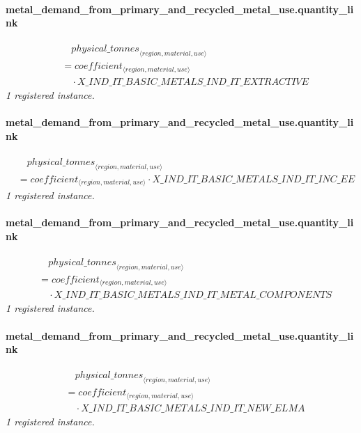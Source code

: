 \documentclass[11pt]{article}
\begin{document}
\paragraph{metal\_demand\_from\_primary\_and\_recycled\_metal\_use.quantity\_link}
\begin{align*}
&\quad {physical\_tonnes}_{\langle region, material, use\rangle}\\
&= coefficient_{\langle region, material, use\rangle}\\
&\quad {}\cdot X\_IND\_IT\_BASIC\_METALS\_IND\_IT\_EXTRACTIVE
\end{align*}
\noindent\emph{1 registered instance.}\par
\paragraph{metal\_demand\_from\_primary\_and\_recycled\_metal\_use.quantity\_link}
\begin{align*}
&\quad {physical\_tonnes}_{\langle region, material, use\rangle}\\
&= coefficient_{\langle region, material, use\rangle} \cdot X\_IND\_IT\_BASIC\_METALS\_IND\_IT\_INC\_EE
\end{align*}
\noindent\emph{1 registered instance.}\par
\paragraph{metal\_demand\_from\_primary\_and\_recycled\_metal\_use.quantity\_link}
\begin{align*}
&\quad {physical\_tonnes}_{\langle region, material, use\rangle}\\
&= coefficient_{\langle region, material, use\rangle}\\
&\quad {}\cdot X\_IND\_IT\_BASIC\_METALS\_IND\_IT\_METAL\_COMPONENTS
\end{align*}
\noindent\emph{1 registered instance.}\par
\paragraph{metal\_demand\_from\_primary\_and\_recycled\_metal\_use.quantity\_link}
\begin{align*}
&\quad {physical\_tonnes}_{\langle region, material, use\rangle}\\
&= coefficient_{\langle region, material, use\rangle}\\
&\quad {}\cdot X\_IND\_IT\_BASIC\_METALS\_IND\_IT\_NEW\_ELMA
\end{align*}
\noindent\emph{1 registered instance.}\par
\end{document}

